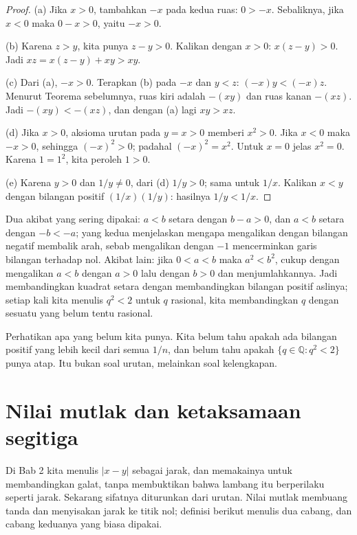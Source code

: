 \begin{proof}
(a) Jika $x>0$, tambahkan $-x$ pada kedua ruas: $0>-x$. Sebaliknya, jika $x<0$ maka
$0-x>0$, yaitu $-x>0$.

(b) Karena $z>y$, kita punya $z-y>0$. Kalikan dengan $x>0$: $x(z-y)>0$. Jadi
$xz=x(z-y)+xy>xy$.

(c) Dari (a), $-x>0$. Terapkan (b) pada $-x$ dan $y<z$: $(-x)y<(-x)z$. Menurut
Teorema sebelumnya, ruas kiri adalah $-(xy)$ dan ruas kanan $-(xz)$. Jadi
$-(xy)<-(xz)$, dan dengan (a) lagi $xy>xz$.

(d) Jika $x>0$, aksioma urutan pada $y=x>0$ memberi $x^2>0$. Jika $x<0$ maka $-x>0$,
sehingga $(-x)^2>0$; padahal $(-x)^2=x^2$. Untuk $x=0$ jelas $x^2=0$. Karena
$1=1^2$, kita peroleh $1>0$.

(e) Karena $y>0$ dan $1/y\neq 0$, dari (d) $1/y>0$; sama untuk $1/x$. Kalikan
$x<y$ dengan bilangan positif $(1/x)(1/y)$: hasilnya $1/y<1/x$.
\end{proof}

Dua akibat yang sering dipakai: $a<b$ setara dengan $b-a>0$, dan $a<b$ setara dengan
$-b<-a$; yang kedua menjelaskan mengapa mengalikan dengan bilangan negatif membalik
arah, sebab mengalikan dengan $-1$ mencerminkan garis bilangan terhadap nol. Akibat lain:
jika $0<a<b$ maka $a^2<b^2$, cukup dengan mengalikan $a<b$ dengan $a>0$ lalu dengan
$b>0$ dan menjumlahkannya. Jadi membandingkan kuadrat setara dengan membandingkan
bilangan positif aslinya; setiap kali kita menulis $q^2<2$ untuk $q$ rasional, kita
membandingkan $q$ dengan sesuatu yang belum tentu rasional.


Perhatikan apa yang belum kita punya. Kita belum tahu apakah ada bilangan positif yang
lebih kecil dari semua $1/n$, dan belum tahu apakah $\{q\in\mathbb{Q}: q^2<2\}$ punya
atap. Itu bukan soal urutan, melainkan soal kelengkapan.

\section{Nilai mutlak dan ketaksamaan segitiga}

Di Bab 2 kita menulis $|x-y|$ sebagai jarak, dan memakainya untuk membandingkan galat,
tanpa membuktikan bahwa lambang itu berperilaku seperti jarak. Sekarang sifatnya
diturunkan dari urutan. Nilai mutlak membuang tanda dan menyisakan jarak ke titik nol;
definisi berikut menulis dua cabang, dan cabang keduanya yang biasa dipakai.


